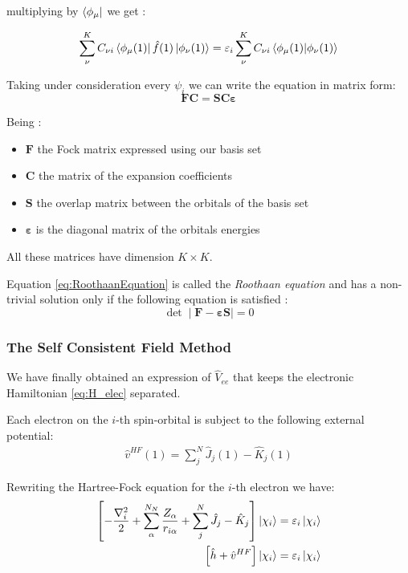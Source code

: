 \documentclass[a4paper,12pt]{article}
\begin{document}
multiplying by $\bra{\phi_{\mu}}$ we get :

\begin{equation}
	 \sum_{\nu}^{K} C_{\nu i} \bra{\phi_{\mu}(1)}\hat{f}(1)\ket{\phi_{\nu}(1)}  
	 = \varepsilon_i \sum_{\nu}^{K} C_{\nu i} \bra{\phi_{\mu}(1)}\ket{\phi_{\nu}(1)}
\end{equation}

Taking under consideration every $\psi_i$ we can write the equation in matrix form:
\begin{equation}\label{eq:RoothaanEquation}
\boxed{
\mathbf{FC} = \mathbf{SC\varepsilon}
}
\end{equation}

Being :
\begin{itemize}
	\item $\mathbf{F}$ the Fock matrix expressed using our basis set
	\item $\mathbf{C}$ the matrix of the expansion coefficients
	\item $\mathbf{S}$ the overlap matrix between the orbitals of the basis set
	\item $\mathbf{\varepsilon}$ is the diagonal matrix of the orbitals energies	
\end{itemize}
All these matrices have dimension $K\times K$.

Equation \eqref{eq:RoothaanEquation} is called the \textit{Roothaan equation} and has a non-trivial solution only if the following  equation is satisfied \cite[p.309]{Atkins}:
\begin{equation}\label{eq:secular}
	\det \mid \mathbf{F - \varepsilon S} \mid =0
\end{equation}


\subsubsection{The Self Consistent Field Method}



We have finally obtained an expression of $\hat{V}_{ee}$ that keeps the electronic Hamiltonian \eqref{eq:H_elec} separated.

Each electron on the $i$-th spin-orbital is subject to the following external potential:
\begin{align}
	\hat{v}^{HF}(1) = \sum_{j}^{N} \hat{J}_{j}(1) - \hat{K}_{j}(1)
\end{align}

Rewriting the Hartree-Fock equation for the $i$-th electron we have:
\begin{align}
	\left[- \frac{\nabla_{i}^{2}}{2} + \sum_{\alpha}^{N_{N}} \frac{Z_{\alpha}}{r_{i\alpha}} + \sum_{j}^{N} \hat{J}_{j} - \hat{K}_{j}  \right] \ket{\chi_i}  & = \varepsilon_i \ket{\chi_i} \\
	\left[\hat{h} + \hat{v}^{HF}\right] \ket{\chi_i} & = \varepsilon_i \ket{\chi_i}
\end{align}
\end{document}

